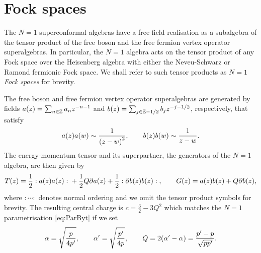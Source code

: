 \documentclass[a4paper,reqno,12pt]{report}
\theoremstyle{definition}
\numberwithin{equation}{section}
\let\originalleft\left     %
\let\originalright\right
\renewcommand{\left}{\mathopen{}\mathclose\bgroup\originalleft}
\renewcommand{\right}{\aftergroup\egroup\originalright}
\newcommand{\func}[2]{#1 \left( #2 \right)} %
\newcommand{\brac}[1]{\left( #1 \right)}
\newcommand{\ZZ}{\mathbb{Z}}
\newcommand{\pd}{\partial}         %
\newcommand{\normord}[1]{\mbox{${} : #1 : {}$}} %
\newcommand{\ns}{Neveu-Schwarz}
\theoremstyle{plain}
\begin{document}
\section{Fock spaces} \label{sec:Fock}

The $N=1$ superconformal algebras have a free field realisation as a subalgebra of the tensor product of the free boson and the free fermion vertex operator superalgebras.  In particular, the $N=1$ algebra acts on the tensor product of any Fock space over the Heisenberg algebra with either the \ns{} or Ramond fermionic Fock space.  We shall refer to such tensor products as \emph{$N=1$ Fock spaces} for brevity.

The free boson and free fermion vertex operator superalgebras are generated by fields $\func{a}{z} = \sum_{n \in \ZZ} a_n z^{-n-1}$ and $\func{b}{z} = \sum_{j \in \ZZ-1/2} b_j z^{-j-1/2}$, respectively, that satisfy
\begin{equation}
\func{a}{z} \func{a}{w} \sim \frac{1}{\brac{z-w}^2}, \qquad \func{b}{z} \func{b}{w} \sim \frac{1}{z-w}.
\end{equation}
The energy-momentum tensor and its superpartner, the generators of the $N=1$ algebra, are then given by
\begin{equation} \label{eq:DefTG}
\func{T}{z} = \frac{1}{2} \normord{\func{a}{z} \func{a}{z}} + \frac{1}{2} Q \func{\pd a}{z} + \frac{1}{2} \normord{\func{\pd b}{z} \func{b}{z}}, \qquad 
\func{G}{z} = \func{a}{z} \func{b}{z} + Q \func{\pd b}{z},
\end{equation}
where $\normord{\cdots}$ denotes normal ordering and we omit the tensor product symbols for brevity.  The resulting central charge is $c = \frac{3}{2} - 3Q^2$ which matches the $N=1$ parametrisation \eqref{eq:ParByt} if we set
\begin{equation}
\alpha = \sqrt{\frac{p \vphantom{p'}}{4p'}}, \qquad \alpha' = \sqrt{\frac{p'}{4p}}, \qquad
Q = 2 \brac{\alpha' - \alpha} = \frac{p'-p}{\sqrt{pp'}}.
\end{equation}
\end{document}

